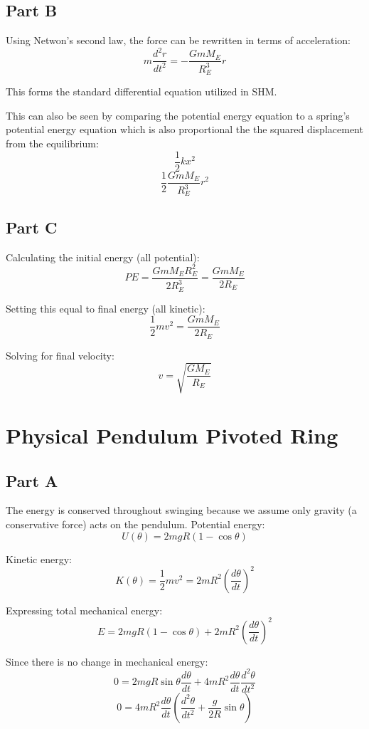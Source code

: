 \documentclass{article}
\begin{document}
\subsection*{ Part B }

Using Netwon's second law, the force can be rewritten in terms of acceleration:
$$ m \frac{ d^{2}r }{ dt^{2} } = - \frac{ G m M_{E} }{ R_{E}^{3} } r $$

This forms the standard differential equation utilized in SHM.

\bigbreak

This can also be seen by comparing the potential energy equation to a spring's
potential energy equation which is also proportional the the squared
displacement from the equilibrium:
$$ \frac{ 1 }{ 2 } k x^{2} $$
$$ \frac{ 1 }{ 2 } \frac{ G m M_{E} }{ R_{E}^{3} } r^{2} $$ 

\subsection*{ Part C }

Calculating the initial energy (all potential):
$$ PE = \frac{ G m M_{E} R_{E}^{2} }{ 2 R_{E}^{3} } = \frac{ G m M_{E} }{ 2 R_{E} } $$

Setting this equal to final energy (all kinetic):
$$ \frac{ 1 }{ 2 } m v^{2} = \frac{ G m M_{E} }{ 2 R_{E} } $$

Solving for final velocity:
$$ v = \sqrt{ \frac{ G M_{E} }{ R_{E} } } $$

\section{ Physical Pendulum Pivoted Ring }

\subsection*{ Part A }

The energy is conserved throughout swinging because we assume only gravity (a
conservative force) acts on the pendulum. Potential energy:
$$ U( \theta ) = 2 m g R ( 1 - \cos \theta ) $$

Kinetic energy:
$$ K( \theta ) = \frac{ 1 }{ 2 } m v^{2} = 2 m R^{2} \left( \frac{ d\theta }{ dt }
\right)^{2} $$

Expressing total mechanical energy:
$$ E =  2 m g R ( 1 - \cos \theta ) + 2 m R^{2} \left( \frac{ d\theta }{ dt }
\right)^{2} $$

Since there is no change in mechanical energy:
$$ 0 = 2 m g R \sin \theta \frac{ d\theta }{ dt } + 4 m R^{2} \frac{ d\theta }{
dt} \frac{ d^{2}\theta }{ dt^{2} } $$
$$ 0 = 4 m R^{2} \frac{ d\theta }{ dt } \left( \frac{ d^{2}\theta }{ dt^{2} } +
\frac{ g }{ 2 R } \sin \theta \right) $$
\end{document}

